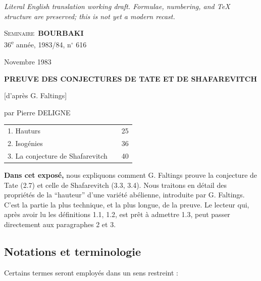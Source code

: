 \documentclass[12pt,a4paper]{article}
\theoremstyle{plain}
\theoremstyle{definition}
\theoremstyle{remark}
\begin{document}
\begin{center}\small\emph{Literal English translation working draft. Formulae, numbering, and TeX structure are preserved; this is not yet a modern recast.}\end{center}
\vspace{0.5em}


\thispagestyle{empty}
\begin{center}
{\Large\scshape Seminaire\ \textbf{BOURBAKI}}\\[6pt]
{\small 36\textsuperscript{e} année, 1983/84, n$^\circ$ 616}\par
\vspace{6pt}
{Novembre 1983}\par
\vspace{24pt}
{\Large\bfseries PREUVE DES CONJECTURES DE TATE ET DE SHAFAREVITCH}\par
\vspace{6pt}
{\large [d'après G. Faltings]}\par
\vspace{12pt}
{\large par Pierre DELIGNE}\par
\end{center}

\vspace{12pt}
\begin{tabular}{@{}llr@{}}
1. Hauturs & \dotfill & 25\\
2. Isogénies & \dotfill & 36\\
3. La conjecture de Shafarevitch & \dotfill & 40\\
\end{tabular}

\vspace{12pt}
\textbf{Dans cet exposé,} nous expliquons comment G. Faltings prouve la conjecture de Tate (2.7) et celle de Shafarevitch (3.3, 3.4). Nous traitons en détail des propriétés de la ``hauteur'' d'une variété abélienne, introduite par G. Faltings. C'est la partie la plus technique, et la plus longue, de la preuve. Le lecteur qui, après avoir lu les définitions 1.1, 1.2, est prêt à admettre 1.3, peut passer directement aux paragraphes 2 et 3.

\subsection*{Notations et terminologie}

Certains termes seront employés dans un sens restreint :
\end{document}
